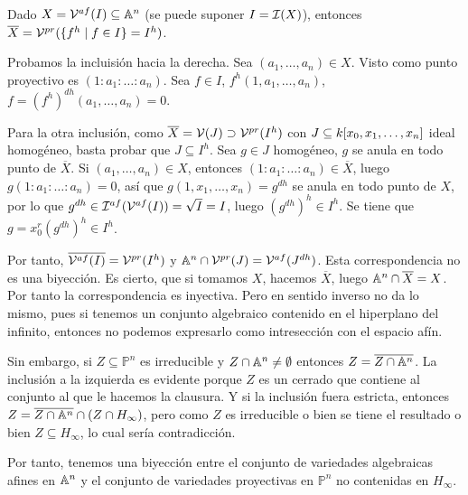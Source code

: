 \documentclass[ACGA.tex]{subfiles}
\begin{document}
\begin{prop}
Dado $X=\mathcal{V}^{af}(I)\subseteq\mathbb{A}^n$ (se puede suponer $I=\mathcal{I}(X)$), entonces $\overline{X}=\mathcal{V}^{pr}(\{f^h\mid f\in I\}=I^h)$. 
\end{prop}
\begin{dem}

Probamos la incluisión hacia la derecha. Sea $(a_1,\dots,a_n)\in X$. Visto como punto proyectivo es $(1:a_1:\dots:a_n)$. Sea $f\in I$, $f^h(1,a_1,\dots,a_n)$, $f=(f^h)^{dh}(a_1,\dots,a_n)=0$. 


Para la otra inclusión, como $\overline{X}=\mathcal{V}(J)\supset\mathcal{V}^{pr}(I^h)$ con $J\subseteq k[x_0,x_1,\dotsc,x_{n}]$ ideal homogéneo, basta probar que $J\subseteq I^h$. Sea $g\in J$ homogéneo, $g$ se anula en todo punto de $\overline{X}$. Si $(a_1,\dots,a_n)\in X$, entonces $(1:a_1:\dots:a_n)\in\overline{X}$, luego $g(1:a_1:\dots:a_n)=0$, así que $g(1,x_1,\dots,x_n)=g^{dh}$ se anula en todo punto de $X$, por lo que $g^{dh}\in\mathcal{I}^{af}(\mathcal{V}^{af}(I))=\sqrt{I}=I$, luego $(g^{dh})^h\in I^h$. Se tiene que $g=x_0^r(g^{dh})^h\in I^h$. 
\end{dem}

Por tanto, $\overline{\mathcal{V}^{af}(I)}=\mathcal{V}^{pr}(I^h)$ y $\mathbb{A}^n\cap\mathcal{V}^{pr}(J)=\mathcal{V}^{af}(J^{dh})$. Esta correspondencia no es una biyección. Es cierto, que si tomamos $X$, hacemos $\overline{X}$, luego $\mathbb{A}^n\cap\overline{X}=X$. Por tanto la correspondencia es inyectiva. Pero en sentido inverso no da lo mismo, pues si tenemos un conjunto algebraico contenido en el hiperplano del infinito, entonces no podemos expresarlo como intresección con el espacio afín. 

Sin embargo, si $Z\subseteq\mathbb{P}^n$ es irreducible y $Z\cap\mathbb{A}^n\neq\emptyset$ entonces $Z=\overline{Z\cap\mathbb{A}^n}$.  La inclusión a la izquierda es evidente porque $Z$ es un cerrado que contiene al conjunto al que le hacemos la clausura. Y si la inclusión fuera estricta, entonces $Z=\overline{Z\cap\mathbb{A}^n}\cap (Z\cap H_\infty)$, pero como $Z$ es irreducible o bien se tiene el resultado o bien $Z\subseteq H_\infty$, lo cual sería contradicción.

Por tanto, tenemos una biyección entre el conjunto de variedades algebraicas afines en $\mathbb{A}^n$ y el conjunto de variedades proyectivas en $\mathbb{P}^n$ no contenidas en $H_\infty$. 
\end{document}
